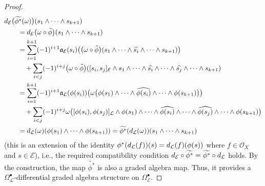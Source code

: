 \documentclass[10pt,a4paper]{amsart}
\begin{document}
\begin{proof}
	\begin{align*}
			& 	{\rm d}_{\mathcal{E}}\bigl(\widetilde{\phi^*}(\omega)\bigr)(s_1 \wedge \cdots \wedge s_{k+1})\\
			&\qquad = {\rm d}_{\mathcal{E}}\bigl(\omega \circ \tilde{\phi}\bigr)(s_1 \wedge \cdots \wedge s_{k+1})\\
			&\qquad = \sum^{k+1}_{i=1}(-1)^{i+1}\mathfrak{a}_{\mathcal{E}}(s_i)\bigl(\bigl(\omega \circ \tilde{\phi}\bigr) (s_1\wedge \cdots \wedge \widehat{s_i} \wedge \cdots \wedge s_{k+1})\bigr)\\
			&\qquad\quad
			+ \sum_{i< j}(-1)^{i+j} \bigl(\omega \circ \tilde{\phi}\bigr)([s_i, s_j]_{\mathcal{E}} \wedge s_1\wedge \cdots \wedge \widehat{s_i}\wedge \cdots \wedge \widehat{s_j}\wedge \cdots \wedge s_{k+1})\\
			&\qquad = \sum^{k+1}_{i=1}(-1)^{i+1}\mathfrak{a}_{\mathcal{L}}(\phi(s_i))\bigl(\omega \bigl(\phi(s_1) \wedge \cdots \wedge \widehat{\phi(s_i)} \wedge \cdots \wedge \phi(s_{k+1})\bigr)\bigr)\\
			&
			\qquad\quad + \sum_{i< j}(-1)^{i+j} \omega \bigl([\phi(s_i), \phi(s_j)]_{\mathcal{L}} \wedge \phi(s_1) \wedge \cdots \wedge \widehat{\phi(s_i)} \wedge \cdots \wedge \widehat{\phi(s_j)}\wedge \cdots \wedge \phi(s_{k+1})\bigr)\\
			&\qquad= {\rm d}_{\mathcal{L}}(\omega) (\phi(s_1) \wedge \cdots \wedge \phi(s_{k+1}))
			 = \widetilde{\phi^*}({\rm d}_{\mathcal{L}}(\omega)) (s_1 \wedge \cdots \wedge s_{k+1})
	\end{align*}
	(this is an extension of the identity $\phi^*({\rm d}_{\mathcal{L}}(f))(s)={\rm d}_{\mathcal{L}}(f)(\phi(s))$ where $f \in \mathcal{O}_X$ and $s \in \mathcal{E}$),
	i.e., the required compatibility condition ${\rm d}_{\mathcal{E}} \circ \widetilde{\phi^*}= \widetilde{\phi^*} \circ {\rm d}_{\mathcal{L}}$ holds. By the construction, the map $\widetilde{\phi^*}$ is also a graded algebra map.
	Thus, it provides a $\Omega^{\bullet}_{\mathcal{L}}$-differential graded algebra structure on $\Omega^{\bullet}_{\mathcal{E}}$.
	

\end{proof}
\end{document}
